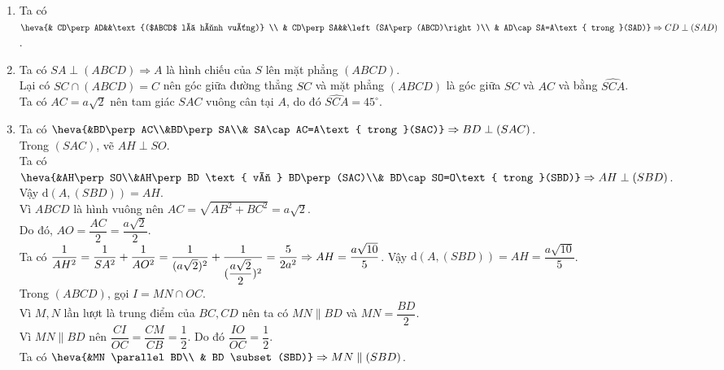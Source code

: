 \begin{bt}
{\begin{center}
\begin{tikzpicture}[>=stealth,line join=round,line cap=round,font=\footnotesize,scale=1]
			\end{tikzpicture}
		\end{center}
		\begin{enumerate}
			\item Ta có $\heva{& CD\perp AD&&\text{($ABCD$ là hình vuông)} \\ & CD\perp SA&&\left(SA\perp (ABCD)\right)\\ & AD\cap SA=A\text{ trong }(SAD)}\Rightarrow CD\perp (SAD)$.
			\item Ta có $SA\perp (ABCD)\Rightarrow A$ là hình chiếu của $S$ lên mặt phẳng $(ABCD)$.\\
			Lại có $SC\cap (ABCD)=C$ nên góc giữa đường thẳng $SC$ và mặt phẳng $(ABCD)$ là góc giữa $SC$ và $AC$ và bằng $\widehat{SCA}$.\\
			Ta có $AC=a\sqrt{2}$ nên tam giác $SAC$ vuông cân tại $A$, do đó $\widehat{SCA}=45^\circ$.
			\item Ta có $\heva{&BD\perp AC\\&BD\perp SA\\& SA\cap AC=A\text{ trong }(SAC)}\Rightarrow BD \perp (SAC)$.\\ 
			Trong $(SAC)$, vẽ $AH \perp SO$.\\
			Ta có $\heva{&AH\perp SO\\&AH\perp BD \text{ vì } BD\perp (SAC)\\& BD\cap SO=O\text{ trong }(SBD)}\Rightarrow AH \perp (SBD)$.\\
			Vậy $\mathrm{d}(A,(SBD))=AH$.\\
			Vì $ABCD$ là hình vuông nên $AC=\sqrt{AB^2+BC^2}=a\sqrt{2}$.\\
			 Do đó, $AO=\dfrac{AC}{2}=\dfrac{a\sqrt{2}}{2}$.\\
			 Ta có $\dfrac{1}{AH^2}=\dfrac{1}{SA^2}+\dfrac{1}{AO^2}=\dfrac{1}{(a\sqrt{2})^2}+\dfrac{1}{(\dfrac{a\sqrt{2}}{2})^2}=\dfrac{5}{2a^2}\\
			 \Rightarrow AH=\dfrac{a\sqrt{10}}{5}$. Vậy $\mathrm{d}(A,(SBD))=AH=\dfrac{a\sqrt{10}}{5}$.\\
			Trong $(ABCD)$, gọi $I=MN\cap OC$.\\
			Vì $M,N$ lần lượt là trung điểm của $BC,CD$ nên ta có $MN \parallel BD$ và $MN=\dfrac{BD}{2}$.\\
			Vì $MN \parallel BD$ nên $\dfrac{CI}{OC}=\dfrac{CM}{CB}=\dfrac{1}{2}$. Do đó $\dfrac{IO}{OC}=\dfrac{1}{2}$.\\
			Ta có $\heva{&MN \parallel BD\\ & BD \subset (SBD)}\Rightarrow MN \parallel (SBD)$.\\

\end{enumerate}}
\end{bt}
